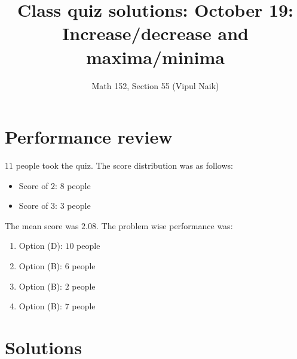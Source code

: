 \documentclass[10pt]{amsart}
\title{Class quiz solutions: October 19: Increase/decrease and maxima/minima}
\author{Math 152, Section 55 (Vipul Naik)}
\begin{document}
\maketitle

\section{Performance review}

$11$ people took the quiz. The score distribution was as follows:

\begin{itemize}
\item Score of $2$: $8$ people
\item Score of $3$: $3$ people
\end{itemize}

The mean score was $2.08$. The problem wise performance was:

\begin{enumerate}
\item Option (D): $10$ people
\item Option (B): $6$ people
\item Option (B): $2$ people
\item Option (B): $7$ people
\end{enumerate}

\section{Solutions}
\end{document}
